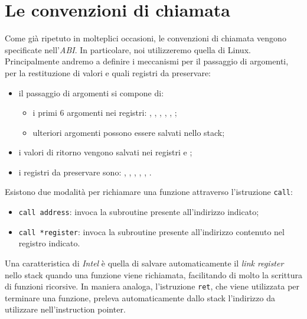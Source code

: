 \documentclass[class=book, crop=false, oneside]{standalone}
\begin{document}
\section{Le convenzioni di chiamata}
Come già ripetuto in molteplici occasioni, le convenzioni di chiamata vengono specificate nell'\emph{ABI}. In particolare, noi utilizzeremo quella di Linux. Principalmente andremo a definire i meccanismi per il passaggio di argomenti, per la restituzione di valori e quali registri da preservare:
\begin{itemize}
	\item il passaggio di argomenti si compone di:
	\begin{itemize}
		\item i primi \(6\) argomenti nei registri: , , , , , ;
		\item ulteriori argomenti possono essere salvati nello stack;
	\end{itemize}
	\item i valori di ritorno vengono salvati nei registri  e ;
	\item i registri da preservare sono: , , , , , .
\end{itemize}

Esistono due modalità per richiamare una funzione attraverso l'istruzione \texttt{call}:
\begin{itemize}
	\item \texttt{call address}: invoca la subroutine presente all'indirizzo indicato;
	\item \texttt{call *register}: invoca la subroutine presente all'indirizzo contenuto nel registro indicato.
\end{itemize}
Una caratteristica di \emph{Intel} è quella di salvare automaticamente il \emph{link register} nello stack quando una funzione viene richiamata, facilitando di molto la scrittura di funzioni ricorsive. In maniera analoga, l'istruzione \texttt{ret}, che viene utilizzata per terminare una funzione, preleva automaticamente dallo stack l'indirizzo da utilizzare nell'instruction pointer.
\end{document}
